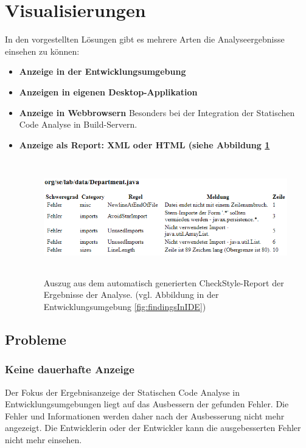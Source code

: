 \section{Visualisierungen} 
In den vorgestellten Lösungen gibt es mehrere Arten die Analyseergebnisse einsehen zu können:
\begin{itemize}
\item \textbf{Anzeige in der Entwicklungsumgebung}
\item \textbf{Anzeigen in eigenen Desktop-Applikation}
\item \textbf{Anzeige in Webbrowsern}
Besonders bei der Integration der Statischen Code Analyse in Build-Servern.
\item \textbf{Anzeige als Report: XML oder HTML (siehe Abbildung \ref{fig:checkstyleHTMLReport}}
\begin{figure}[tp]
  \centering
  \includegraphics[height=5cm]{images/checkstyleHTMLReport.PNG}
 \caption[Auszug aus dem automatisch generierten CheckStyle-Report der Ergebnisse der Analyse. (vgl. Abbildung in der Entwicklungsumgebung \ref{fig:findingsInIDE})]{Auszug aus dem automatisch generierten CheckStyle-Report der Ergebnisse der Analyse. (vgl. Abbildung in der Entwicklungsumgebung \ref{fig:findingsInIDE})}
  \label{fig:checkstyleHTMLReport}
\end{figure}
\end{itemize}
\subsection{Probleme} 

\subsubsection{Keine dauerhafte Anzeige} 
Der Fokus der Ergebnisanzeige der Statischen Code Analyse in Entwicklungsumgebungen liegt auf das Ausbessern der gefunden Fehler. Die Fehler und Informationen werden daher nach der Ausbesserung nicht mehr angezeigt. Die Entwicklerin oder der Entwickler kann die ausgebesserten Fehler nicht mehr einsehen.


